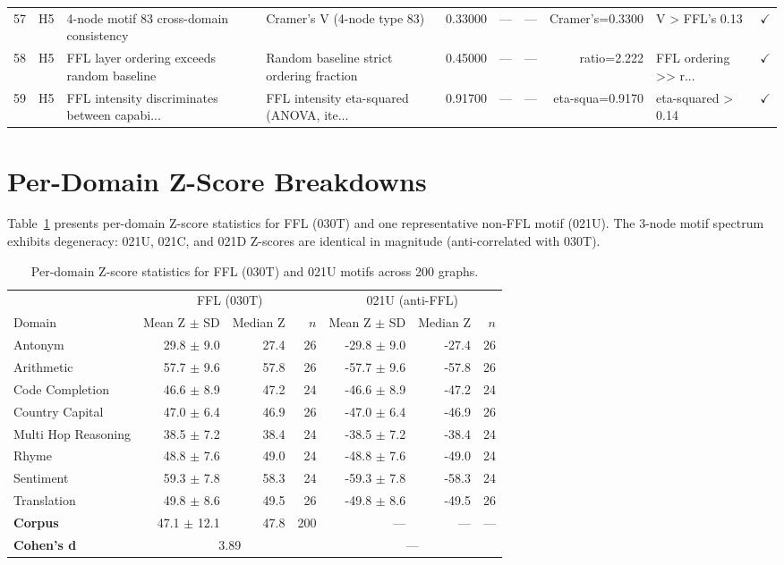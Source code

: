 \documentclass[11pt,a4paper]{article}
\begin{document}
\begin{landscape}
\begin{longtable}{rlp{3.2cm}p{3cm}rrrrp{1.5cm}l}
\rowcolor{rowgray}
57 & H5 & 4-node motif 83 cross-domain consistency & Cramer's V (4-node type 83) & 0.33000 & --- & --- & Cramer's=0.3300 & V \textgreater{} FFL's 0.13 & $\checkmark$ \\
58 & H5 & FFL layer ordering exceeds random baseline & Random baseline strict ordering fraction & 0.45000 & --- & --- & ratio=2.222 & FFL ordering \textgreater{}\textgreater{} r... & $\checkmark$ \\
\rowcolor{rowgray}
59 & H5 & FFL intensity discriminates between capabi... & FFL intensity eta-squared (ANOVA, ite... & 0.91700 & --- & --- & eta-squa=0.9170 & eta-squared \textgreater{} 0.14 & $\checkmark$ \\
\end{longtable}
\end{landscape}


\section{Per-Domain Z-Score Breakdowns}
Table~\ref{tab:domain-z} presents per-domain Z-score statistics for FFL (030T) and one representative non-FFL motif (021U). The 3-node motif spectrum exhibits degeneracy: 021U, 021C, and 021D Z-scores are identical in magnitude (anti-correlated with 030T).

\begin{table}[htbp]
\centering
\footnotesize
\caption{Per-domain Z-score statistics for FFL (030T) and 021U motifs across 200 graphs.}
\label{tab:domain-z}
\begin{tabular}{l|rrr|rrr}
\toprule
 & \multicolumn{3}{c|}{FFL (030T)} & \multicolumn{3}{c}{021U (anti-FFL)} \\
Domain & Mean Z $\pm$ SD & Median Z & $n$ & Mean Z $\pm$ SD & Median Z & $n$ \\
\midrule
\rowcolor{rowgray}
Antonym & 29.8 $\pm$ 9.0 & 27.4 & 26 & -29.8 $\pm$ 9.0 & -27.4 & 26 \\
Arithmetic & 57.7 $\pm$ 9.6 & 57.8 & 26 & -57.7 $\pm$ 9.6 & -57.8 & 26 \\
\rowcolor{rowgray}
Code Completion & 46.6 $\pm$ 8.9 & 47.2 & 24 & -46.6 $\pm$ 8.9 & -47.2 & 24 \\
Country Capital & 47.0 $\pm$ 6.4 & 46.9 & 26 & -47.0 $\pm$ 6.4 & -46.9 & 26 \\
\rowcolor{rowgray}
Multi Hop Reasoning & 38.5 $\pm$ 7.2 & 38.4 & 24 & -38.5 $\pm$ 7.2 & -38.4 & 24 \\
Rhyme & 48.8 $\pm$ 7.6 & 49.0 & 24 & -48.8 $\pm$ 7.6 & -49.0 & 24 \\
\rowcolor{rowgray}
Sentiment & 59.3 $\pm$ 7.8 & 58.3 & 24 & -59.3 $\pm$ 7.8 & -58.3 & 24 \\
Translation & 49.8 $\pm$ 8.6 & 49.5 & 26 & -49.8 $\pm$ 8.6 & -49.5 & 26 \\
\midrule
\textbf{Corpus} & 47.1 $\pm$ 12.1 & 47.8 & 200 & --- & --- & --- \\
\textbf{Cohen's d} & \multicolumn{3}{c|}{3.89} & \multicolumn{3}{c}{---} \\
\bottomrule
\end{tabular}
\end{table}
\end{document}
